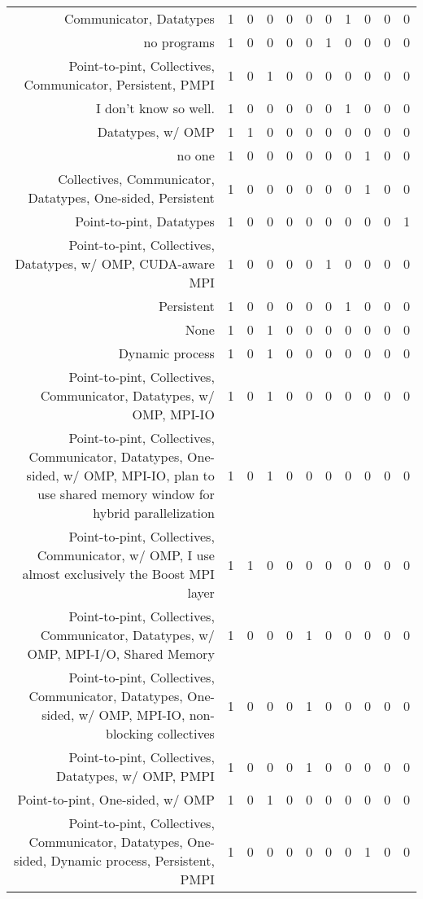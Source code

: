 {\begin{landscape}
\begin{longtable}[htb]{r|c|c|c|c|c|c|c|c|c|c}
{Communicator, Datatypes} & 1 & 0 & 0 & 0 & 0 & 0 & 1 & 0 & 0 & 0 \\%
{no programs} & 1 & 0 & 0 & 0 & 0 & 1 & 0 & 0 & 0 & 0 \\%
{Point-to-pint, Collectives, Communicator, Persistent, PMPI} & 1 & 0 & 1 & 0 & 0 & 0 & 0 & 0 & 0 & 0 \\%
{I don't know so well.} & 1 & 0 & 0 & 0 & 0 & 0 & 1 & 0 & 0 & 0 \\%
{Datatypes, w/ OMP} & 1 & 1 & 0 & 0 & 0 & 0 & 0 & 0 & 0 & 0 \\%
{no one} & 1 & 0 & 0 & 0 & 0 & 0 & 0 & 1 & 0 & 0 \\%
{Collectives, Communicator, Datatypes, One-sided, Persistent} & 1 & 0 & 0 & 0 & 0 & 0 & 0 & 1 & 0 & 0 \\%
{Point-to-pint, Datatypes} & 1 & 0 & 0 & 0 & 0 & 0 & 0 & 0 & 0 & 1 \\%
{Point-to-pint, Collectives, Datatypes, w/ OMP, CUDA-aware MPI} & 1 & 0 & 0 & 0 & 0 & 1 & 0 & 0 & 0 & 0 \\%
{Persistent} & 1 & 0 & 0 & 0 & 0 & 0 & 1 & 0 & 0 & 0 \\%
{None} & 1 & 0 & 1 & 0 & 0 & 0 & 0 & 0 & 0 & 0 \\%
{Dynamic process} & 1 & 0 & 1 & 0 & 0 & 0 & 0 & 0 & 0 & 0 \\%
{Point-to-pint, Collectives, Communicator, Datatypes, w/ OMP, MPI-IO} & 1 & 0 & 1 & 0 & 0 & 0 & 0 & 0 & 0 & 0 \\%
{Point-to-pint, Collectives, Communicator, Datatypes, One-sided, w/ OMP, MPI-IO, plan to use shared memory window for hybrid parallelization} & 1 & 0 & 1 & 0 & 0 & 0 & 0 & 0 & 0 & 0 \\%
{Point-to-pint, Collectives, Communicator, w/ OMP, I use almost exclusively the Boost MPI layer} & 1 & 1 & 0 & 0 & 0 & 0 & 0 & 0 & 0 & 0 \\%
{Point-to-pint, Collectives, Communicator, Datatypes, w/ OMP, MPI-I/O, Shared Memory} & 1 & 0 & 0 & 0 & 1 & 0 & 0 & 0 & 0 & 0 \\%
{Point-to-pint, Collectives, Communicator, Datatypes, One-sided, w/ OMP, MPI-IO, non-blocking collectives} & 1 & 0 & 0 & 0 & 1 & 0 & 0 & 0 & 0 & 0 \\%
{Point-to-pint, Collectives, Datatypes, w/ OMP, PMPI} & 1 & 0 & 0 & 0 & 1 & 0 & 0 & 0 & 0 & 0 \\%
{Point-to-pint, One-sided, w/ OMP} & 1 & 0 & 1 & 0 & 0 & 0 & 0 & 0 & 0 & 0 \\%
{Point-to-pint, Collectives, Communicator, Datatypes, One-sided, Dynamic process, Persistent, PMPI} & 1 & 0 & 0 & 0 & 0 & 0 & 0 & 1 & 0 & 0 \\%

\end{longtable}
\end{landscape}}
